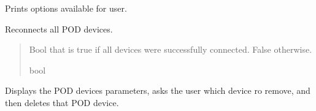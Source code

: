 \documentclass[letterpaper,10pt,english]{sphinxmanual}
\begin{document}
\begin{fulllineitems}
\begin{fulllineitems}
\end{fulllineitems}


\begin{fulllineitems}
\label{\detokenize{Setup.SetupAllDevices:Setup.SetupAllDevices.Setup_PodDevices.SetupAll._PrintOptions}}
\pysigstartsignatures
{}
\pysigstopsignatures
\sphinxAtStartPar
Prints options available for user.

\end{fulllineitems}


\begin{fulllineitems}
\label{\detokenize{Setup.SetupAllDevices:Setup.SetupAllDevices.Setup_PodDevices.SetupAll._Reconnect}}
\pysigstartsignatures
{}
\pysigstopsignatures
\sphinxAtStartPar
Reconnects all POD devices.
\begin{quote}\begin{description}
\sphinxAtStartPar
Bool that is true if all devices were successfully connected. False otherwise.

\sphinxAtStartPar
bool

\end{description}\end{quote}

\end{fulllineitems}


\begin{fulllineitems}
\label{\detokenize{Setup.SetupAllDevices:Setup.SetupAllDevices.Setup_PodDevices.SetupAll._RemoveDevice}}
\pysigstartsignatures
{}
\pysigstopsignatures
\sphinxAtStartPar
Displays the POD devices parameters, asks the user which device ro remove, and then         deletes that POD device.


\end{fulllineitems}
\end{fulllineitems}
\end{document}
